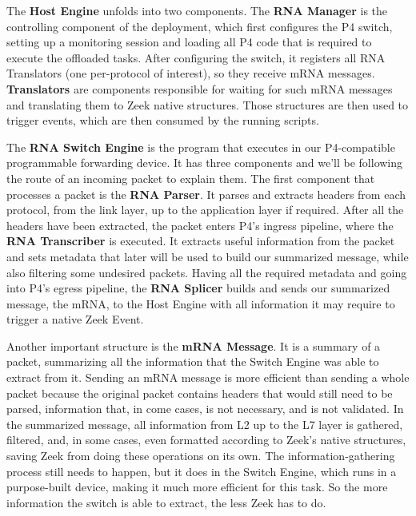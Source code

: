 The \textbf{Host Engine} unfolds into two components. The \textbf{RNA Manager} is the controlling component of the deployment, which first configures the P4 switch, setting up a monitoring session and loading all P4 code that is required to execute the offloaded tasks. After configuring the switch, it registers all RNA Translators (one per-protocol of interest), so they receive mRNA messages. \textbf{Translators} are components responsible for waiting for such mRNA messages and translating them to Zeek native structures. Those structures are then used to trigger events, which are then consumed by the running scripts.

The \textbf{RNA Switch Engine} is the program that executes in our P4-compatible programmable forwarding device. It has three components and we'll be following the route of an incoming packet to explain them. The first component that processes a packet is the \textbf{RNA Parser}. It parses and extracts headers from each protocol, from the link layer, up to the application layer if required. After all the headers have been extracted, the packet enters P4's ingress pipeline, where the \textbf{RNA Transcriber} is executed. It extracts useful information from the packet and sets metadata that later will be used to build our summarized message, while also filtering some undesired packets. Having all the required metadata and going into P4's egress pipeline, the \textbf{RNA Splicer} builds and sends our summarized message, the mRNA, to the Host Engine with all information it may require to trigger a native Zeek Event.

Another important structure is the \textbf{mRNA Message}. It is a summary of a packet, summarizing all the information that the Switch Engine was able to extract from it. Sending an mRNA message is more efficient than sending a whole packet because the original packet contains headers that would still need to be parsed, information that, in come cases, is not necessary, and is not validated. In the summarized message, all information from L2 up to the L7 layer is gathered, filtered, and, in some cases, even formatted according to Zeek's native structures, saving Zeek from doing these operations on its own. The information-gathering process still needs to happen, but it does in the Switch Engine, which runs in a purpose-built device, making it much more efficient for this task. So the more information the switch is able to extract, the less Zeek has to do.

